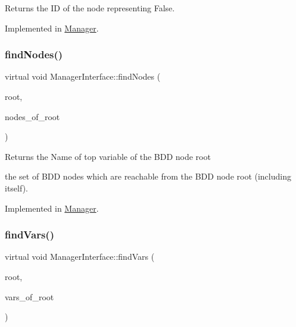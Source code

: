 \begin{DoxyReturn}{Returns}
the ID of the node representing False. 
\end{DoxyReturn}


Implemented in \hyperlink{classManager_ae9bae01509e6063313024cd85a8eb569}{Manager}.

\mbox{\label{classManagerInterface_a7d2044388d1c5b8160a57f09596dae98}} 
\subsubsection{\texorpdfstring{find\+Nodes()}{findNodes()}}
{\footnotesize\ttfamily virtual void Manager\+Interface\+::find\+Nodes (\begin{DoxyParamCaption}\item[{const B\+D\+D\+\_\+\+ID \&}]{root,  }\item[{std\+::set$<$ B\+D\+D\+\_\+\+ID $>$ \&}]{nodes\+\_\+of\+\_\+root }\end{DoxyParamCaption})\hspace{0.3cm}{\ttfamily [pure virtual]}}

\begin{DoxyReturn}{Returns}
the Name of top variable of the B\+DD node root 

the set of B\+DD nodes which are reachable from the B\+DD node root (including itself). 
\end{DoxyReturn}


Implemented in \hyperlink{classManager_a2aefec8f025f8d7417eff8493bcd7f04}{Manager}.

\mbox{\label{classManagerInterface_ab95672f3ba820047f67d52bdd323a955}} 
\subsubsection{\texorpdfstring{find\+Vars()}{findVars()}}
{\footnotesize\ttfamily virtual void Manager\+Interface\+::find\+Vars (\begin{DoxyParamCaption}\item[{const B\+D\+D\+\_\+\+ID \&}]{root,  }\item[{std\+::set$<$ B\+D\+D\+\_\+\+ID $>$ \&}]{vars\+\_\+of\+\_\+root }\end{DoxyParamCaption})\hspace{0.3cm}{\ttfamily [pure virtual]}}

